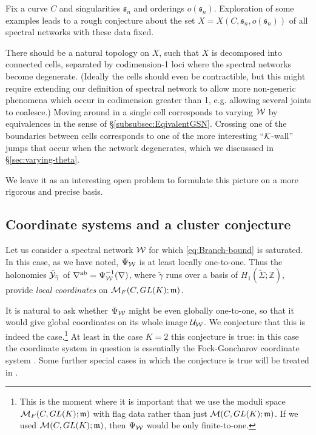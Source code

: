 \documentclass[11pt,a4paper]{article}
\def\IZ{{\mathbb{Z}}}
\def\CM {{\cal M}}
\def\CK {{\cal K}}
\def\wnet {{\cal W}}
\def\CY {{\cal Y}}
\def\CK{{\cal K}}
\def\CU{{\cal U}}
\def\ab{{\mathrm{ab}}}
\newcommand{\ti}[1]{\textit{#1}}
\def\fs{\mathfrak{s}}
\def\IZ{{\mathbb{Z}}}
\def\CM {{\cal M}}
\def\CK {{\cal K}}
\def\wnet {{\cal W}}
\def\CY {{\cal Y}}
\def\CK{{\cal K}}
\def\CU{{\cal U}}
\begin{document}
Fix a curve $C$ and singularities $\fs_n$ and orderings $o(\fs_n)$.
Exploration of some examples leads to a rough conjecture about the set $X = X(C, \fs_n,o(\fs_n))$ of all
spectral networks with these data fixed.

There should be a natural topology on $X$, such that $X$ is decomposed into connected cells,
separated by codimension-1 loci where the spectral networks become degenerate.  (Ideally the
cells should even be contractible, but this might require extending our definition of spectral
network to allow more non-generic phenomena which occur in codimension greater than 1,
e.g. allowing several joints to coalesce.)
Moving around in a single cell corresponds to varying $\wnet$ by
equivalences in the
sense of \S\ref{subsubsec:EqivalentGSN}.  Crossing one of the boundaries between
cells corresponds to one of the more interesting ``$\CK$-wall'' jumps that occur when
the network degenerates, which we discusssed in \S\ref{sec:varying-theta}.

We leave it as an interesting open problem to formulate this picture
on a more rigorous and precise basis.


\subsection{Coordinate systems and a cluster conjecture}\label{subsec:Coord-System}

Let us consider a spectral network $\wnet$ for which \eqref{eq:Branch-bound}
is saturated.  In this case, as we have noted,
$\Psi_\wnet$ is at least locally one-to-one.
Thus the holonomies $\tilde\CY_{\tilde\gamma}$ of $\nabla^\ab = \Psi_\wnet^{-1}(\nabla)$,
where $\tilde\gamma$ runs over a basis of $H_1(\tilde\Sigma;\IZ)$,
provide \ti{local coordinates} on $\CM_F(C, GL(K);\mathfrak{m})$.

It is natural to ask whether $\Psi_\wnet$ might be even globally one-to-one,
so that it would give global coordinates on its whole image $\CU_\wnet$.
We conjecture that this is indeed the case.\footnote{This is the moment where it is important
that we use the moduli space $\CM_F(C, GL(K);\mathfrak{m})$ with flag data rather than just $\CM(C, GL(K);\mathfrak{m})$.  If we used $\CM(C, GL(K);\mathfrak{m})$, then
$\Psi_\wnet$ would be only finite-to-one.}
At least in the case $K=2$ this conjecture
is true:  in this case the coordinate system in
question is essentially the Fock-Goncharov coordinate system \cite{MR2233852,Gaiotto:2009hg}.
Some further special cases in which the conjecture is true
will be treated in \cite{gmn6-to-appear}.
\end{document}
